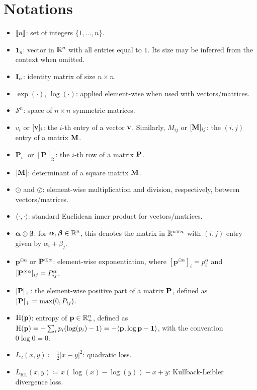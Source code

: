\newpage
\section*{Notations}

\begin{itemize}
    \item ${[\![n]\!]}$: set of integers $\{1,\dots,n\}$.
    \item $\mathbf{1}_n$: vector in $\mathbb{R}^n$ with all entries equal to $1$. Its size may be inferred from the context when omitted.
    \item ${\mathbf{I}}_n$: identity matrix of size $n \times n$.
    \item $\exp(\cdot)$, $\log(\cdot)$: applied element-wise when used with vectors/matrices.
    \item $\mathcal{S}^n$: space of $n \times n$ symmetric matrices.
    \item $v_i$ or $[{\mathbf{v}}]_i$: the $i$-th entry of a vector ${\mathbf{v}}$. Similarly, $M_{ij}$ or $[{\mathbf{M}}]_{ij}$: the $(i,j)$ entry of a matrix ${\mathbf{M}}$.
    \item $\mathbf{P}_{i:}$ or $[\mathbf{P}]_{i:}$: the $i$-th row of a matrix $\mathbf{P}$.
    \item $|{\mathbf{M}}|$: determinant of a square matrix ${\mathbf{M}}$.
    \item $\odot$ and $\oslash$: element-wise multiplication and division, respectively, between vectors/matrices.
    \item $\langle \cdot, \cdot \rangle$: standard Euclidean inner product for vectors/matrices.
    \item $\bm{\alpha} \oplus \bm{\beta}$: for $\bm{\alpha}, \bm{\beta} \in \mathbb{R}^n$, this denotes the matrix in $\mathbb{R}^{n \times n}$ with $(i,j)$ entry given by $\alpha_i + \beta_j$.
    \item $\bm{p}^{\odot \alpha}$ or ${\mathbf{P}}^{\odot \alpha}$: element-wise exponentiation, where $[\bm{p}^{\odot \alpha}]_i = p_i^\alpha$ and $[{\mathbf{P}}^{\odot \alpha}]_{ij} = P_{ij}^\alpha$.
    \item $[{\mathbf{P}}]_+$: the element-wise positive part of a matrix ${\mathbf{P}}$, defined as $[{\mathbf{P}}]_+ = \max(0, P_{ij})$.
    \item $\operatorname{H}(\mathbf{p})$: entropy of $\mathbf{p} \in \mathbb{R}^{n}_+$, defined as $\operatorname{H}(\mathbf{p}) = -\sum_{i} p_i (\log(p_i) - 1) = -\langle \mathbf{p}, \log \mathbf{p} - \bm{1} \rangle$, with the convention $0 \log 0 = 0$.
    \item $L_2(x,y) \coloneqq \frac{1}{2} |x - y|^2$: quadratic loss.
    \item $L_{\mathrm{KL}}(x,y) \coloneqq x (\log(x) - \log(y)) - x + y$: Kullback-Leibler divergence loss.

\end{itemize}
